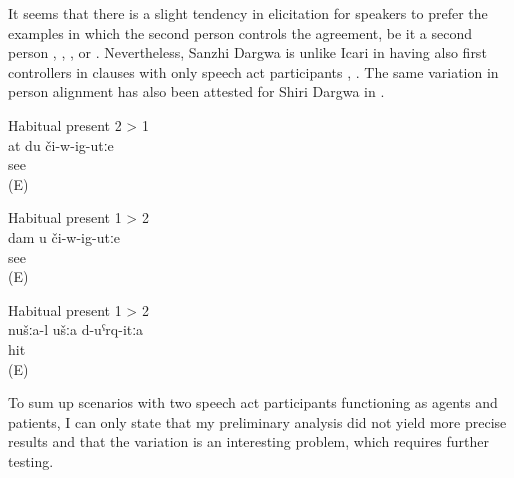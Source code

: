 It seems that there is a slight tendency in elicitation for speakers to prefer the examples in which the second person controls the agreement, be it a second person , , , or  . Nevertheless, Sanzhi Dargwa is unlike Icari in having also first  controllers in clauses with only speech act participants , . The same variation in person alignment has also been attested for Shiri Dargwa in \citet{Belyaev2013}.
%
\begin{exe}
		\ex	Habitual present 2 > 1\\	\label{ex:You see me HP21@21b}
		\gll	at	du	či-w-ig-utːe\\
					see\\
		\glt	{} (E)
		
		\ex	Habitual present 1 > 2\\	\label{ex:I see you HP12@21a}
		\gll	dam	u	či-w-ig-utːe\\
					see\\
		\glt	{} (E)

		\ex	Habitual present 1 > 2\\	\label{ex:‎We hit you HP12}
		\gll	nušːa-l	ušːa	d-uˁrq-itːa\\
					hit\\
		\glt	{} (E)
\end{exe}

To sum up scenarios with two speech act participants functioning as agents and patients, I can only state that my preliminary analysis did not yield more precise results and that the variation is an interesting problem, which requires further testing.

